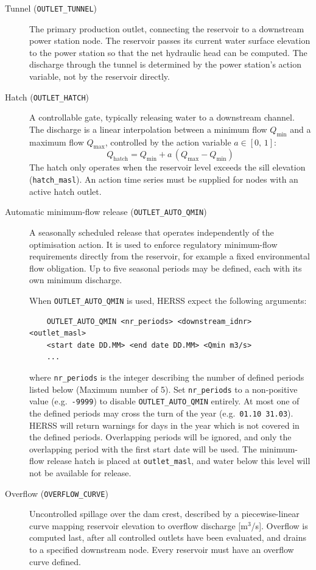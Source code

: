 \documentclass[a4paper, 12pt]{report}
\begin{document}
	\begin{description}
	
	\item[Tunnel (\texttt{OUTLET\_TUNNEL})] The primary production outlet, connecting the
	reservoir to a downstream power station node. The reservoir passes its current water
	surface elevation to the power station so that the net hydraulic head can be computed.
	The discharge through the tunnel is determined by the power station's action variable,
	not by the reservoir directly.
	
	\item[Hatch (\texttt{OUTLET\_HATCH})] A controllable gate, typically releasing water to a
	downstream channel. The discharge is a linear interpolation between a minimum flow
	$Q_\mathrm{min}$ and a maximum flow $Q_\mathrm{max}$, controlled by the action
	variable $a \in [0,\,1]$:
	$$Q_\mathrm{hatch} = Q_\mathrm{min} + a\,(Q_\mathrm{max} - Q_\mathrm{min})$$
	The hatch only operates when the reservoir level exceeds the sill elevation
	(\texttt{hatch\_masl}). An action time series must be supplied for nodes with an
	active hatch outlet.
	
	\item[Automatic minimum-flow release (\texttt{OUTLET\_AUTO\_QMIN})] A seasonally
	scheduled release that operates independently of the optimisation action. It is used
	to enforce regulatory minimum-flow requirements directly from the reservoir, for
	example a fixed environmental flow obligation. Up to five seasonal periods may be
	defined, each with its own minimum discharge.

    When \texttt{OUTLET\_AUTO\_QMIN} is used, HERSS expect the following arguments:
    \begin{verbatim}
    OUTLET_AUTO_QMIN <nr_periods> <downstream_idnr> <outlet_masl>
    <start date DD.MM> <end date DD.MM> <Qmin m3/s>
    ...
    \end{verbatim}
    where \texttt{nr\_periods} is the integer describing the number of defined periods listed
    below (Maximum number of 5). Set \texttt{nr\_periods} to a non-positive value (e.g.\
    \texttt{-9999}) to disable \texttt{OUTLET\_AUTO\_QMIN} entirely. At most one of the defined periods may
    cross the turn of the year (e.g.\ \texttt{01.10 31.03}). HERSS will return warnings for days in the year which is not covered in the defined periods.  Overlapping periods will be ignored, and only the overlapping period with the first start date will be used. The minimum-flow release hatch is placed at \texttt{outlet\_masl}, and water below this level will not be available for release.
	
	\item[Overflow (\texttt{OVERFLOW\_CURVE})] Uncontrolled spillage over the dam crest,
	described by a piecewise-linear curve mapping reservoir elevation to overflow discharge
	[m$^3$/s]. Overflow is computed last, after all controlled outlets have been evaluated,
	and drains to a specified downstream node. Every reservoir must have an overflow curve
	defined.
	
	\end{description}
\end{document}
